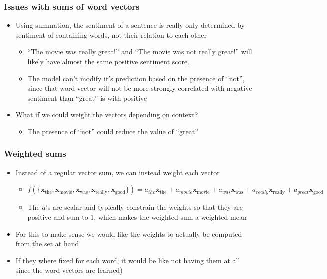 \documentclass{beamer}
\renewcommand{\vec}[1]{{\boldsymbol{#1}}}
\newcommand{\svec}[2]{{\vec{#1}_{#2}}}
\begin{document}
  \begin{frame}
    \frametitle{Issues with sums of word vectors}
    \begin{itemize}
    \item
      Using summation, the sentiment of a sentence is really only determined by sentiment of containing words, not their relation to each other
      \begin{itemize}
      \item “The movie was really great!” and “The movie was not really great!” will likely have almost the same positive sentiment score.
        \item The model can’t modify it’s prediction based on the presence of “not”, since that word vector will not be more strongly correlated with negative sentiment than “great” is with positive
      \end{itemize}
    \item What if we could weight the vectors depending on context?
      \begin{itemize}
      \item The presence of “not” could reduce the value of “great”
      \end{itemize}
    \end{itemize}
  \end{frame}

  \begin{frame}
    \frametitle{Weighted sums}
    \begin{itemize}
    \item Instead of a regular vector sum, we can instead weight each vector
      \begin{itemize}
      \item $f(\{ \svec{x}{\text{the}}, \svec{x}{\text{movie}}, \svec{x}{\text{was}}, \svec{x}{\text{really}}, \svec{x}{\text{good}} \}) = a_{the} \svec{x}{\text{the}}+ a_{movie}\svec{x}{\text{movie}}+ a_{was}\svec{x}{\text{was}}+a_{really}\svec{x}{\text{really}}+a_{great}\svec{x}{\text{good}}$
        \item The $a$'s are scalar and typically constrain the weights so that they are positive and sum to 1, which makes the weighted sum a weighted mean

      \end{itemize}
    \item For this to make sense we would like the weights to actually be computed from the set at hand
    \item If they where fixed for each word, it would be like not having them at all since the word vectors are learned)
    \end{itemize}
  \end{frame}
\end{document}

